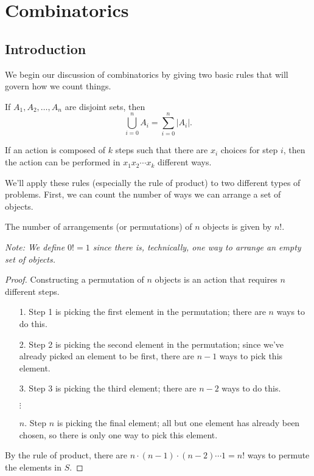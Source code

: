 \documentclass[../m55main.tex]{subfiles}
\begin{document}
\chapter{Combinatorics}

\section{Introduction}
We begin our discussion of combinatorics by giving two basic rules that will govern how we count things.

\begin{theorem}
    If $A_1, A_2, \ldots, A_n$ are disjoint sets, then
    \[ \bigcup_{i=0}^n A_i = \sum_{i=0}^n |A_i|. \]
\end{theorem}


\begin{theorem}
    If an action is composed of $k$ steps such that there are $x_i$ choices for step $i$, then the action can be performed in $x_1 x_2 \cdots x_k$ different ways.
\end{theorem}


We'll apply these rules (especially the rule of product) to two different types of problems.
First, we can count the number of ways we can arrange a set of objects.

\begin{theorem}
    The number of arrangements (or permutations) of $n$ objects is given by $n!$. %

    \medskip
    \textit{Note: We define $0! = 1$ since there is, technically, one way to arrange an empty set of objects.}
\end{theorem}

\begin{proof}
    Constructing a permutation of $n$ objects is an action that requires $n$ different steps.
    \begin{itemize}
        \item [1.] Step 1 is picking the first element in the permutation; there are $n$ ways to do this.
        \item [2.] Step 2 is picking the second element in the permutation; since we've already picked an element to be first, there are $n-1$ ways to pick this element.
        \item [3.] Step 3 is picking the third element; there are $n-2$ ways to do this.
        \item [$\vdots$\phantom{.}]
        \item [$n$.] Step $n$ is picking the final element; all but one element has already been chosen, so there is only one way to pick this element.
    \end{itemize}
    By the rule of product, there are $n \cdot (n-1) \cdot (n-2) \cdots 1 = n!$ ways to permute the elements in $S$.
\end{proof}
\end{document}
